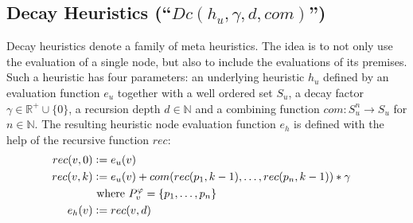 \subsection{Decay Heuristics (``$Dc(h_u,\gamma,d,com)$'') }
\label{sec:decay}
Decay heuristics denote a family of meta heuristics. 
The idea is to not only use the evaluation of a single node, but also to include the evaluations of its premises.
Such a heuristic has four parameters: an underlying heuristic $h_u$ defined by an evaluation function $e_u$ together with a well ordered set $S_u$, a decay factor $\gamma \in \mathbb{R}^+ \cup \{0\}$, a recursion depth $d \in \mathbb{N}$ and a combining function $com: S_u^n \rightarrow S_u$ for $n \in \mathbb{N}$.
The resulting heuristic node evaluation function $e_h$ is defined with the help of the recursive function $rec$:
\begin{align*}
	rec(v,0) &\mathrel{\mathop:}= e_u(v) \\
	rec(v,k) &\mathrel{\mathop:}= e_u(v) + com(rec(p_1,k-1),\ldots,rec(p_n,k-1)) * \gamma\\
	& \text{ where } P_{v}^{\varphi} = \{p_1,\ldots,p_n\}\\
	e_h(v) &\mathrel{\mathop:}= rec(v,d) &
\end{align*}

